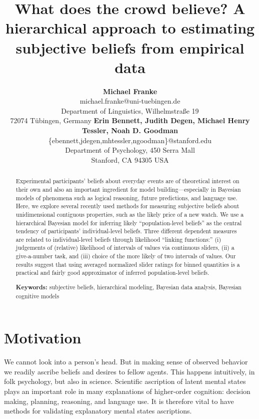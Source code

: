 \documentclass[10pt,letterpaper]{article}
\title{What does the crowd believe? A hierarchical approach to estimating subjective beliefs
  from empirical data}
\author{{\large \bf Michael Franke} \\
  michael.franke@uni-tuebingen.de \\
  Department of Linguistics, Wilhelmstra\ss e 19 \\
 72074 T\"{u}bingen, Germany \AND 
 {\large \bf Erin Bennett, Judith Degen, Michael Henry Tessler, Noah D. Goodman}\\
     \{ebennett,jdegen,mhtessler,ngoodman\}@stanford.edu \\
     Department of Psychology, 450 Serra Mall \\
  Stanford, CA 94305 USA }
\begin{document}
\maketitle

\begin{abstract}
  Experimental participants' beliefs about everyday events are of theoretical interest on their
  own and also an important ingredient for model building---especially in Bayesian models of
  phenomena such as logical reasoning, future predictions, and language use. Here, we explore
  several recently used methods for measuring subjective beliefs about unidimensional
  contiguous properties, such as the likely price of a new watch. We use a hierarchical
  Bayesian model for inferring likely ``population-level beliefs'' as the central tendency of
  participants' individual-level beliefs.  Three different dependent measures are related to
  individual-level beliefs through likelihood ``linking functions:'' (i) judgements of
  (relative) likelihood of intervals of values via continuous sliders, (ii) a give-a-number
  task, and (iii) choice of the more likely of two intervals of values. Our results suggest
  that using averaged normalized slider ratings for binned quantities is a practical and fairly
  good approximator of inferred population-level beliefs.

  \textbf{Keywords:} subjective beliefs, hierarchical modeling, Bayesian data analysis,
  Bayesian cognitive models
\end{abstract}




\section{Motivation}

We cannot look into a person's head. But in making sense of observed behavior we readily
ascribe beliefs and desires to fellow agents. This happens intuitively, in folk psychology, but
also in science. Scientific ascription of latent mental states plays an important role in many
explanations of higher-order cognition: decision making, planning, reasoning, and language
use. It is therefore vital to have methods for validating explanatory mental states
ascriptions.
\end{document}
